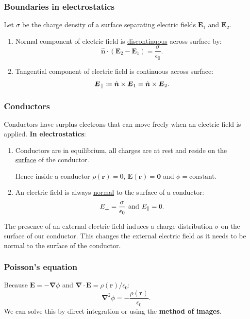 \documentclass{article}
\newcommand{\deq}{\vcentcolon=}
\newcommand{\vc}[1]{\boldsymbol{#1}}
\begin{document}
\begin{multicols*}{3}
\subsubsection*{Boundaries in electrostatics}
Let $\sigma$ be the charge density of a surface
separating electric fields $\vc{E}_1$ and $\vc{E}_2$.
\begin{enumerate}
    \item Normal component of electric field is
    \underline{discontinuous} across surface by:
    $$\hat{\vc{n}}\cdot(\vc{E}_2-\vc{E}_1)
    =\frac{\sigma}{\epsilon_0}.$$

    \item Tangential component of electric
    field is continuous across surface:
    $$\vc{E}_{\parallel}\deq\hat{\vc{n}}\times\vc{E}_1
    =\hat{\vc{n}}\times\vc{E}_2.$$
\end{enumerate}

\subsubsection*{Conductors}
Conductors have surplus electrons that can move freely
when an electric field is applied. 
\textbf{In electrostatics}:
\begin{enumerate}
    \item Conductors are in equilibrium,
    all charges are at rest and reside on the
    \underline{surface} of the conductor.

    Hence inside a conductor
    $\rho(\vc{r})=0$, $\vc{E}(\vc{r})=\vc{0}$
    and $\phi=\text{constant}$.

    \item An electric field is always \underline{normal}
    to the surface of a conductor:
    $$E_{\perp}=\frac{\sigma}{\epsilon_0}
    \hspace{0.05in}\text{and}\hspace{0.05in}
    E_{\parallel}=0.$$
\end{enumerate}
The presence of an external electric field induces
a charge distribution $\sigma$ on the surface of our conductor.
This changes the external electric field as it
needs to be normal to the surface of the conductor.

\subsubsection*{Poisson's equation}
Because $\vc{E}=-\vc{\nabla}\phi$ and
$\vc{\nabla}\cdot\vc{E}=\rho(\vc{r})/\epsilon_0$:
$$\vc{\nabla}^2\phi=-\frac{\rho(\vc{r})}{\epsilon_0}.$$
We can solve this by direct integration
or using the \textbf{method of images}.


\end{multicols*}
\end{document}
